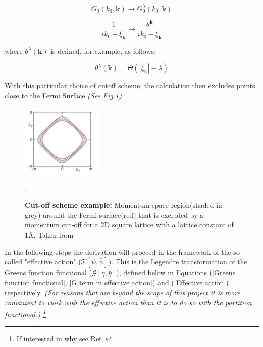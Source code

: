 \documentclass[12pt]{article}
\begin{document}
\begin{equation} \label{propagator transform 1}
    G_0(k_0, \textbf{k}) \rightarrow G_0^{\lambda}(k_0, \textbf{k})
\end{equation}


\begin{equation} \label{propagator transform 2}
    \frac{1}{ik_0 - \xi_{\textbf{k}}} \rightarrow \frac{\theta^{\textbf{k}}}{ik_0 - \xi_{\textbf{k}}}
\end{equation}

\noindent where $\theta^{\lambda}(\textbf{k})$ is defined, for example, as follows:

\begin{equation} \label{theta def}
    \theta^{\lambda}(\textbf{k}) = \Theta(|\xi_{\textbf{k}}| - \lambda)    
\end{equation}

\noindent With this particular choice of cutoff scheme, the calculation then excludes points close to the Fermi Surface \textit{(See Fig.\ref{fig:Truncation})}. \par
\begin{figure}[htbp]  %
    \centering
    \includegraphics[width=0.35\textwidth]{Truncation.png}  %
    \caption{\textbf{Cut-off scheme example:} Momentum space region(shaded in grey) around the Fermi-surface(red) that is excluded 
    by a momentum cut-off for a 2D square lattice with a lattice constant of 1\AA. Taken from \cite {metzner2012functional}}.
    \label{fig:Truncation}
\end{figure}

\medskip
\noindent In the following steps the derivation will proceed in the framework of the  so-called "effective action" ($\mathcal{T}[\psi, \bar{\psi}]$).
This is the Legendre transformation of the Greens function functional ($\mathcal{G}[\eta, \bar{\eta}]$), defined below in Equations (\ref{Greens function functional}, \ref{G term in effective action}) and (\ref{Effective action}) respectively. 
\textit{(For reasons that
are beyond the scope of this project it is more convinient to work with the effective action than it is to do so with the partition functional.) \footnote{If interested in why see Ref. \cite{metzner2012functional}}}
\end{document}
